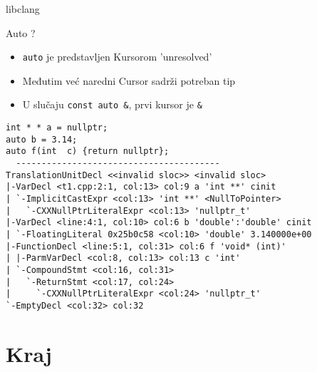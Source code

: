 \documentclass{beamer}
\begin{document}
\begin{frame}[fragile]{libclang}


  Auto ?
\begin{itemize}
    \item{\verb|auto| je predstavljen Kursorom 'unresolved'}
    \item{Međutim već naredni Cursor sadrži potreban tip}
    \item{U slučaju \verb|const auto &|, prvi kursor je \verb|&|}
\end{itemize}

  \scriptsize
\begin{verbatim}
int * * a = nullptr;                                                            
auto b = 3.14;                                                                  
auto f(int  c) {return nullptr};
  ----------------------------------------
TranslationUnitDecl <<invalid sloc>> <invalid sloc>
|-VarDecl <t1.cpp:2:1, col:13> col:9 a 'int **' cinit
| `-ImplicitCastExpr <col:13> 'int **' <NullToPointer>
|   `-CXXNullPtrLiteralExpr <col:13> 'nullptr_t'
|-VarDecl <line:4:1, col:10> col:6 b 'double':'double' cinit
| `-FloatingLiteral 0x25b0c58 <col:10> 'double' 3.140000e+00
|-FunctionDecl <line:5:1, col:31> col:6 f 'void* (int)'
| |-ParmVarDecl <col:8, col:13> col:13 c 'int'
| `-CompoundStmt <col:16, col:31>
|   `-ReturnStmt <col:17, col:24>
|     `-CXXNullPtrLiteralExpr <col:24> 'nullptr_t'
`-EmptyDecl <col:32> col:32
\end{verbatim}

\end{frame}






\section{Kraj}
\end{document}
